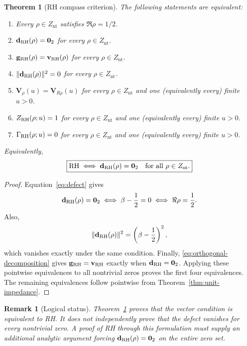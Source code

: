 \documentclass[11pt]{article}
\newtheorem{theorem}[definition]{Theorem}
\newtheorem{remark}[definition]{Remark}
\newcommand{\Znt}{Z_{\mathrm{nt}}}
\newcommand{\vzero}{\mathbf 0}
\begin{document}
\begin{theorem}[RH compass criterion]\label{thm:criterion}
The following statements are equivalent:
\begin{enumerate}
 \item Every $\rho\in\Znt$ satisfies $\Re\rho=1/2$.
 \item $\mathbf d_{\rm RH}(\rho)=\vzero_2$ for every $\rho\in\Znt$.
 \item $\mathbf g_{\rm RH}(\rho)=\mathbf v_{\rm RH}(\rho)$ for every
 $\rho\in\Znt$.
 \item $\|\mathbf d_{\rm RH}(\rho)\|^2=0$ for every $\rho\in\Znt$.
 \item $\mathbf V_\rho(u)=\mathbf V_{R\rho}(u)$ for every $\rho\in\Znt$ and one
 (equivalently every) finite $u>0$.
 \item $Z_{\rm RH}(\rho;u)=1$ for every $\rho\in\Znt$ and one
 (equivalently every) finite $u>0$.
 \item $\Gamma_{\rm RH}(\rho;u)=0$ for every $\rho\in\Znt$ and one
 (equivalently every) finite $u>0$.
\end{enumerate}
Equivalently,
\begin{equation}\label{eq:boxed-criterion}
 \boxed{\mathrm{RH}\iff
 \mathbf d_{\rm RH}(\rho)=\vzero_2\quad\text{for all }\rho\in\Znt.}
\end{equation}
\end{theorem}

\begin{proof}
Equation~\eqref{eq:defect} gives
\begin{equation}
 \mathbf d_{\rm RH}(\rho)=\vzero_2
 \iff \beta-\frac12=0
 \iff \Re\rho=\frac12.
\end{equation}
Also,
\begin{equation}
 \|\mathbf d_{\rm RH}(\rho)\|^2
 =\left(\beta-\frac12\right)^2,
\end{equation}
which vanishes exactly under the same condition.  Finally,
\eqref{eq:orthogonal-decomposition} gives
$\mathbf g_{\rm RH}=\mathbf v_{\rm RH}$ exactly when
$\mathbf d_{\rm RH}=\vzero_2$.  Applying these pointwise equivalences to all nontrivial
zeros proves the first four equivalences.  The remaining equivalences follow pointwise from
Theorem~\ref{thm:unit-impedance}.
\end{proof}

\begin{remark}[Logical status]
Theorem~\ref{thm:criterion} proves that the vector condition is equivalent to RH.  It does not
independently prove that the defect vanishes for every nontrivial zero.  A proof of RH through
this formulation must supply an additional analytic argument forcing
$\mathbf d_{\rm RH}(\rho)=\vzero_2$ on the entire zero set.
\end{remark}
\end{document}
